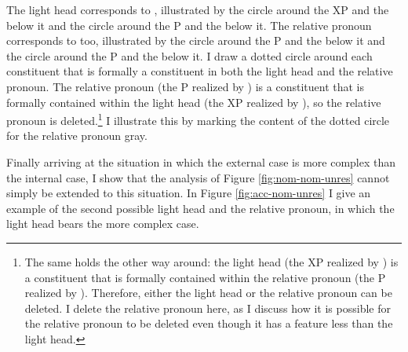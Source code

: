 The light head corresponds to , illustrated by the circle around the XP and the  below it and the circle around the P and the  below it. The relative pronoun corresponds to  too, illustrated by the circle around the P and the  below it and the circle around the P and the  below it.
I draw a dotted circle around each constituent that is formally a constituent in both the light head and the relative pronoun.
The relative pronoun (the P realized by ) is a constituent that is formally contained within the light head (the XP realized by ), so the relative pronoun is deleted.\footnote{
The same holds the other way around: the light head (the XP realized by ) is a constituent that is formally contained within the relative pronoun (the P realized by ). Therefore, either the light head or the relative pronoun can be deleted. I delete the relative pronoun here, as I discuss how it is possible for the relative pronoun to be deleted even though it has a feature less than the light head.
}
I illustrate this by marking the content of the dotted circle for the relative pronoun gray.

Finally arriving at the situation in which the external case is more complex than the internal case, I show that the analysis of Figure \ref{fig:nom-nom-unres} cannot simply be extended to this situation.
In Figure \ref{fig:acc-nom-unres} I give an example of the second possible light head and the relative pronoun, in which the light head bears the more complex case.

